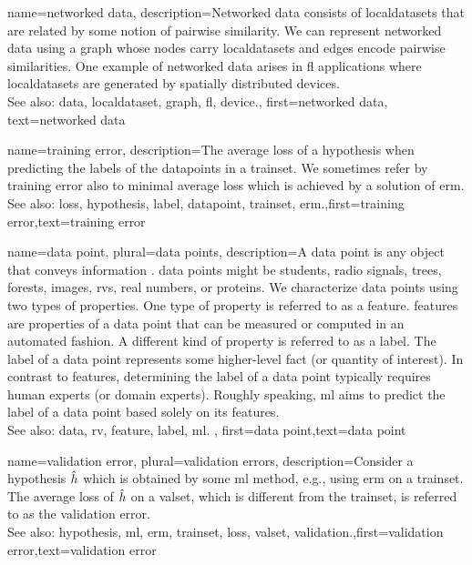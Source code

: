 {name={networked data},
	description={Networked \gls{data} consists of \glspl{localdataset} 
	that are related by some notion of pairwise similarity. We can represent networked 
	\gls{data} using a \gls{graph} whose nodes carry \glspl{localdataset} and edges encode 
	pairwise similarities. One example of networked \gls{data} arises in \gls{fl} applications 
	where \glspl{localdataset} are generated by spatially distributed \glspl{device}.
			\\
		See also: \gls{data}, \gls{localdataset}, \gls{graph}, \gls{fl}, \gls{device}.}, 
	first={networked data},
	text={networked data}  
}

{
	name={training error},
	description={The average \gls{loss} of a \gls{hypothesis} when 
		predicting the \glspl{label} of the \glspl{datapoint} in a \gls{trainset}. 
		We sometimes refer by training error also to minimal average \gls{loss} 
		which is achieved by a solution of \gls{erm}.
				\\
		See also: \gls{loss}, \gls{hypothesis}, \gls{label}, \gls{datapoint}, \gls{trainset}, \gls{erm}.},first={training error},text={training error}  
}

{name={data point}, plural={data points},
description={A \gls{data} point is any object that conveys information \cite{coverthomas}. \Gls{data} points might be 
		students, radio signals, trees, forests, images, \glspl{rv}, real numbers, or proteins. We characterize \gls{data} points 
		using two types of properties. One type of property is referred to as a \gls{feature}. \Glspl{feature} are properties of a 
		\gls{data} point that can be measured or computed in an automated fashion. 
		A different kind of property is referred to as a \gls{label}. The \gls{label} of 
		a \gls{data} point represents some higher-level fact (or quantity of interest). In 
		contrast to \glspl{feature}, determining the \gls{label} of a \gls{data} point typically 
		requires human experts (or domain experts). Roughly speaking, \gls{ml} aims to predict 
		the \gls{label} of a \gls{data} point based solely on its \glspl{feature}. 
				\\
		See also: \gls{data}, \gls{rv}, \gls{feature}, \gls{label}, \gls{ml}.
		}, first={data point},text={data point}  
}


{name={validation error}, plural={validation errors},
 description={Consider a \gls{hypothesis} $\hat{h}$ which is 
 	obtained by some \gls{ml} method, e.g., using \gls{erm} on a \gls{trainset}. The average \gls{loss} 
 	of $\hat{h}$ on a \gls{valset}, which is different from the \gls{trainset}, is referred 
 	to as the \gls{validation} error.
			\\
		See also: \gls{hypothesis}, \gls{ml}, \gls{erm}, \gls{trainset}, \gls{loss}, \gls{valset}, \gls{validation}.},first={validation error},text={validation error}  
}

